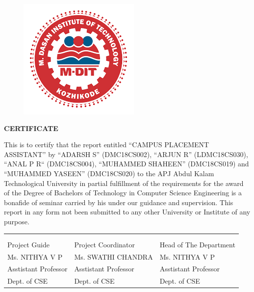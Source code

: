 \documentclass[12pt]{article}
\begin{document}
\begin{changemargin}{0.5cm}{0.5cm}
\begin{figure}[H]
\begin{center}
\includegraphics[scale=.4]{MDIT}
\end{center} 
\end{figure}
\begin{center}\LARGE\bf{CERTIFICATE} \end{center}
\vspace{5mm}
\justifying
This is to certify that the report entitled “CAMPUS PLACEMENT ASSISTANT” by “ADARSH S” (DMC18CS002), “ARJUN R” (LDMC18CS030), “ANAL P R“ (DMC18CS004), “MUHAMMED SHAHEEN” (DMC18CS019) and “MUHAMMED YASEEN” (DMC18CS020) to the APJ Abdul Kalam Technological University in partial fulfillment of the requirements for the award of the Degree of Bachelors of Technology in Computer Science Engineering is a bonafide of seminar carried by his under our guidance and supervision. This report in any form not been submitted to any other University or Institute of any purpose.
\thispagestyle{empty}
\begin{center}
\begin{tabularx}{1\textwidth} { 
  >{\raggedright\arraybackslash}X 
   >{\raggedright\arraybackslash}X 
   >{\raggedright\arraybackslash}X }
 
\\  \\ \\ 

Project Guide & Project Coordinator & Head of The Department  \\  

Ms. NITHYA V P  & Ms. SWATHI CHANDRA & Ms. NITHYA V P \\ 

Asstistant Professor & Asstistant Professor &Asstistant Professor \\  

Dept. of CSE & Dept. of CSE & Dept. of CSE   


\end{tabularx}
\end{center}


\end{changemargin}
\end{document}
